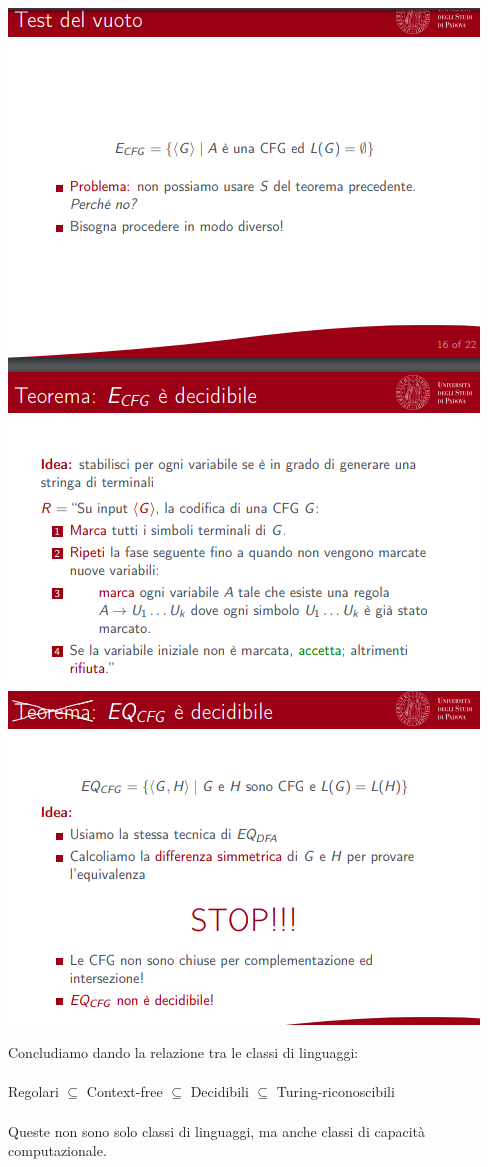 \documentclass[]{article}
\begin{document}
\begin{center}
				\includegraphics[scale=0.8]{problemaCF3.png}
				\includegraphics[scale=0.8]{problemaCF4.png}
			\end{center}
			Concludiamo dando la relazione tra le classi di linguaggi:\\\\
			Regolari $\subseteq$ Context-free $\subseteq$ Decidibili $\subseteq$ Turing-riconoscibili\\\\
			Queste non sono solo classi di linguaggi, ma anche classi di capacità computazionale.
\end{document}

